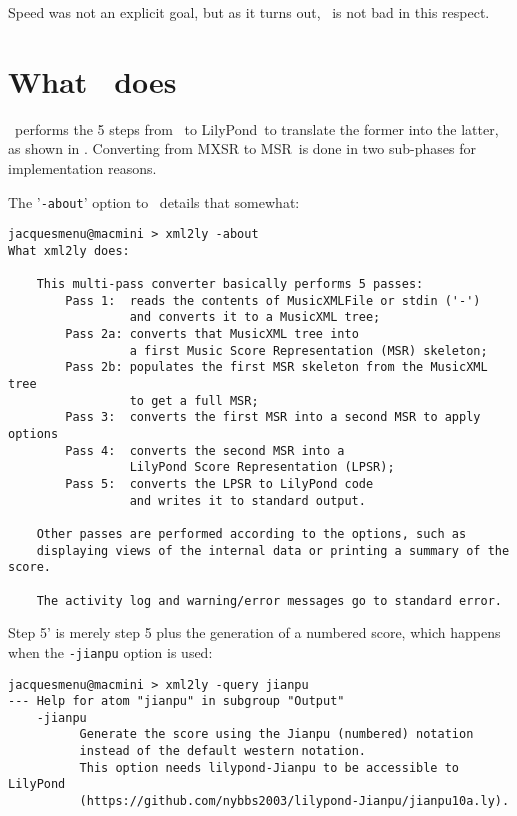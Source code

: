 Speed was not an explicit goal, but as it turns out, \xmlToLy\ is not bad in this respect.


\section{What \xmlToLy\ does}

\xmlToLy\ performs the 5 steps from \mxml\ to LilyPond\ to translate the former into the latter, as shown in . Converting from MXSR to MSR\ is done in two sub-phases for implementation reasons.

The '{\tt -about}' option to \xmlToLy\ details that somewhat:
\begin{lstlisting}[language=MusicXML]
jacquesmenu@macmini > xml2ly -about
What xml2ly does:

    This multi-pass converter basically performs 5 passes:
        Pass 1:  reads the contents of MusicXMLFile or stdin ('-')
                 and converts it to a MusicXML tree;
        Pass 2a: converts that MusicXML tree into
                 a first Music Score Representation (MSR) skeleton;
        Pass 2b: populates the first MSR skeleton from the MusicXML tree
                 to get a full MSR;
        Pass 3:  converts the first MSR into a second MSR to apply options
        Pass 4:  converts the second MSR into a
                 LilyPond Score Representation (LPSR);
        Pass 5:  converts the LPSR to LilyPond code
                 and writes it to standard output.

    Other passes are performed according to the options, such as
    displaying views of the internal data or printing a summary of the score.

    The activity log and warning/error messages go to standard error.
\end{lstlisting}

Step 5' is merely step 5 plus the generation of a numbered score, which happens when the {\tt -jianpu} option is used:
\begin{lstlisting}[language=Terminal]
jacquesmenu@macmini > xml2ly -query jianpu
--- Help for atom "jianpu" in subgroup "Output"
    -jianpu
          Generate the score using the Jianpu (numbered) notation
          instead of the default western notation.
          This option needs lilypond-Jianpu to be accessible to LilyPond
          (https://github.com/nybbs2003/lilypond-Jianpu/jianpu10a.ly).
\end{lstlisting}


